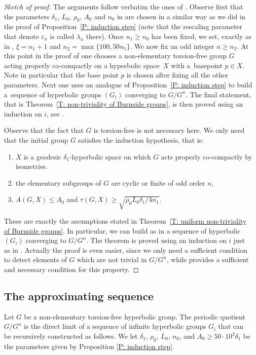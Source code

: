 \documentclass[JEP,XML,SOM,Unicode, NoEqCountersInSection,published]{cedram}
\theoremstyle{plain}
\theoremstyle{definition}
\begin{document}
\begin{proof}[Sketch of proof]
The arguments follow verbatim the ones of \cite[\S 4]{coulon_detecting_2018}.
Observe first that the parameters $\delta_1$, $L_0$, $\rho_0$, $A_0$ and $n_0$ in \cite[p.\,797]{coulon_detecting_2018} are chosen in a similar way as we did in the proof of Proposition~\ref{P: induction step} (note that the rescaling parameter that denote $\varepsilon_n$ is called $\lambda_n$ there).
Once $n_1 \geq n_0$ has been fixed, we set, exactly as in \cite[p.\,797]{coulon_detecting_2018}, $\xi = n_1 + 1$ and $n_2 = \max\{100, 50n_1\}$.
We now fix an odd integer $n \geq n_2$.
At this point in the proof of \cite{coulon_detecting_2018} one chooses a non-elementary torsion-free group $G$ acting properly co-compactly on a hyperbolic space~$X$ with a~basepoint $p \in X$.
Note in particular that the base point $p$ is chosen after fixing all the other parameters.
Next one uses an analogue of Proposition~\ref{P: induction step} to build a~sequence of hyperbolic groups $(G_i)$ converging to $G/G^n$.
The final statement, that is Theorem~\ref{T: non-triviality of Burnside groups}, is then proved using an induction on $i$, see \cite[Prop.\,4.6]{coulon_detecting_2018}.

Observe that the fact that $G$ is torsion-free is not necessary here.
We only need that the initial group $G$ satisfies the induction hypothesis, that is:
\begin{enumerate}
\item $X$ is a geodesic $\delta_1$-hyperbolic space on which $G$ acts properly co-compactly by isometries.
\item the elementary subgroups of $G$ are cyclic or finite of odd order $n$,
\item $A(G,X)\leqslant A_0$ and $\tau(G,X)\geqslant \sqrt{\rho_0 L_0 \delta_1/4n_1}$.
\end{enumerate}
These are exactly the assumptions stated in Theorem~\ref{T: uniform non-triviality of Burnside groups}.
In particular, we can build as in \cite{coulon_detecting_2018} a sequence of hyperbolic $(G_i)$ converging to $G/G^n$.
The theorem is proved using an induction on $i$ just as in \cite{coulon_detecting_2018}.
Actually the proof is even easier, since we only need a sufficient condition to detect elements of $G$ which are not trivial in $G/G^n$, while \cite{coulon_detecting_2018} provides a sufficient and necessary condition for this property.
\end{proof}

\subsection{The approximating sequence}
Let $G$ be a non-elementary torsion-free hyperbolic group.
The periodic quotient $G/G^n$ is the direct limit of a sequence of infinite hyperbolic groups $G_i$ that can be recursively constructed as follows.
We let $\delta_1$, $\rho_0$, $L_0$, $n_0$, and $A_0 \geq 50\cdot 10^3\delta_1$ be the parameters given by Proposition \ref{P: induction step}.
\end{document}
